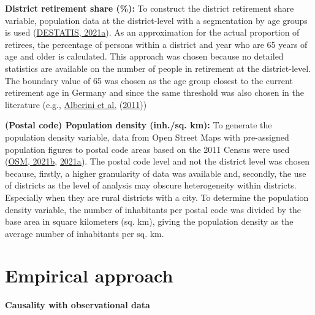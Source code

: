 \documentclass[12pt,twoside]{reedthesis}
\begin{document}
\textbf{District retirement share (\%):} To construct the district retirement share variable, population data at the district-level with a segmentation by age groups is used (\protect\hyperlink{ref-destatis21c}{DESTATIS, 2021a}). As an approximation for the actual proportion of retirees, the percentage of persons within a district and year who are 65 years of age and older is calculated. This approach was chosen because no detailed statistics are available on the number of people in retirement at the district-level. The boundary value of 65 was chosen as the age group closest to the current retirement age in Germany and since the same threshold was also chosen in the literature (e.g., \protect\hyperlink{ref-alberini_etal11}{Alberini et al.} (\protect\hyperlink{ref-alberini_etal11}{2011}))

\textbf{(Postal code) Population density (inh./sq. km):} To generate the population density variable, data from Open Street Maps with pre-assigned population figures to postal code areas based on the 2011 Census were used (\protect\hyperlink{ref-osm21}{OSM, 2021b}, \protect\hyperlink{ref-osm21a}{2021a}). The postal code level and not the district level was chosen because, firstly, a higher granularity of data was available and, secondly, the use of districts as the level of analysis may obscure heterogeneity within districts. Especially when they are rural districts with a city. To determine the population density variable, the number of inhabitants per postal code was divided by the base area in square kilometers (sq. km), giving the population density as the average number of inhabitants per sq. km.

\hypertarget{empirical-model}{%
\section{Empirical approach}\label{empirical-model}}

\textbf{Causality with observational data}
\end{document}
